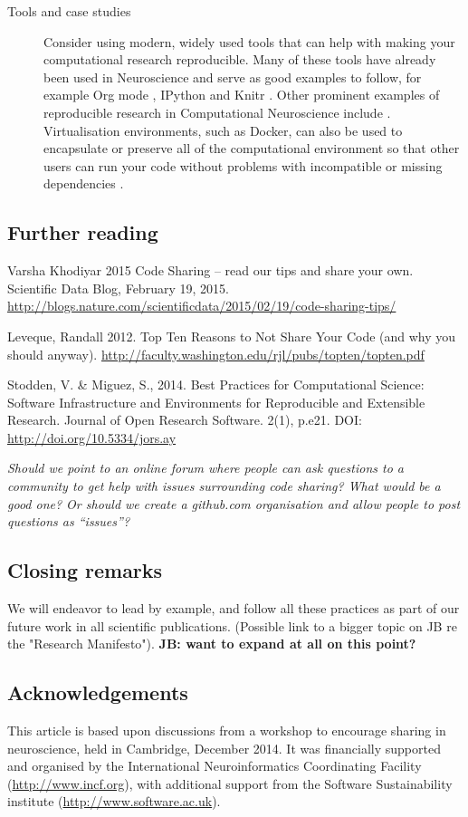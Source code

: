 \documentclass[11pt]{article}
\begin{document}
\begin{description}
\item [Tools and case studies] Consider using modern, widely used tools that can help with making your computational research reproducible.  Many of
  these tools have already been used in Neuroscience and serve as good
  examples to follow, for example Org mode \cite{Delescluse2011},
  IPython \cite{Stevens2013} and Knitr \cite{Eglen2014}.  Other
  prominent examples of reproducible research in Computational
  Neuroscience include \cite{Vogels2011-c8c,Waskom2014-gd}.
  Virtualisation environments, such as Docker, can also be used to
  encapsulate or preserve all of the computational environment so that
  other users can run your code without problems with incompatible or missing dependencies \cite{Boettiger2015}.
  

\end{description}

\subsection*{Further reading}

Varsha Khodiyar 2015 Code Sharing – read our tips and share your own. Scientific Data Blog, February 19, 2015. \url{http://blogs.nature.com/scientificdata/2015/02/19/code-sharing-tips/}

Leveque, Randall 2012. Top Ten Reasons to Not Share Your Code (and why
you should anyway). 
\url{http://faculty.washington.edu/rjl/pubs/topten/topten.pdf}

Stodden, V. \& Miguez, S., 2014. Best Practices for Computational Science: Software Infrastructure and Environments for Reproducible and Extensible Research. Journal of Open Research Software. 2(1), p.e21. DOI: \url{http://doi.org/10.5334/jors.ay}

\textit{Should we point to an online forum where people can ask
  questions to a community to get help with issues surrounding code
  sharing?  What would be a good one?  Or should we create a
  github.com organisation and allow people to post questions as
  ``issues''?}


\subsection*{Closing remarks}

We will endeavor to lead by example, and follow all these practices as
part of our future work in all scientific publications.  (Possible
link to a bigger topic on JB re the "Research Manifesto").
\textbf{JB: want to expand at all on this point?}

\subsection*{Acknowledgements}

This article is based upon discussions from a workshop to encourage
sharing in neuroscience, held in Cambridge, December 2014.  It was
financially supported and organised by the International
Neuroinformatics Coordinating Facility (\url{http://www.incf.org}),
with additional support from the Software Sustainability institute
(\url{http://www.software.ac.uk}).



\printbibliography
\end{document}
